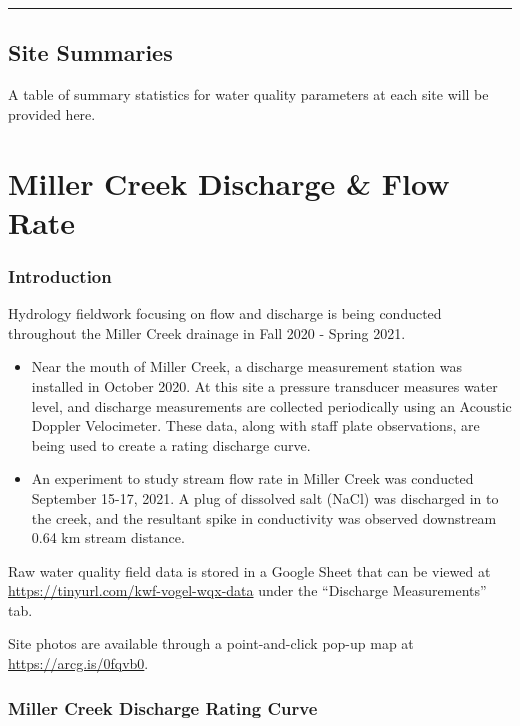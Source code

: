 \documentclass[
]{book}
\begin{document}
\begin{center}\rule{0.5\linewidth}{0.5pt}\end{center}

\hypertarget{site-summaries}{%
\section{Site Summaries}\label{site-summaries}}

A table of summary statistics for water quality parameters at each site will be provided here.

\hypertarget{miller-creek-discharge-flow-rate}{%
\chapter{Miller Creek Discharge \& Flow Rate}\label{miller-creek-discharge-flow-rate}}

\hypertarget{introduction-1}{%
\subsection{Introduction}\label{introduction-1}}

Hydrology fieldwork focusing on flow and discharge is being conducted throughout the Miller Creek drainage in Fall 2020 - Spring 2021.

\begin{itemize}
\item
  Near the mouth of Miller Creek, a discharge measurement station was installed in October 2020. At this site a pressure transducer measures water level, and discharge measurements are collected periodically using an Acoustic Doppler Velocimeter. These data, along with staff plate observations, are being used to create a rating discharge curve.
\item
  An experiment to study stream flow rate in Miller Creek was conducted September 15-17, 2021. A plug of dissolved salt (NaCl) was discharged in to the creek, and the resultant spike in conductivity was observed downstream 0.64 km stream distance.
\end{itemize}

Raw water quality field data is stored in a Google Sheet that can be viewed at \url{https://tinyurl.com/kwf-vogel-wqx-data} under the ``Discharge Measurements'' tab.

Site photos are available through a point-and-click pop-up map at \url{https://arcg.is/0fqvb0}.

\hypertarget{miller-creek-discharge-rating-curve}{%
\subsection{Miller Creek Discharge Rating Curve}\label{miller-creek-discharge-rating-curve}}
\end{document}
